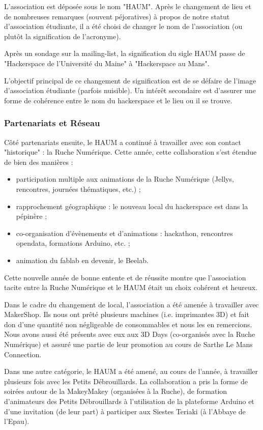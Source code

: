\documentclass[a4paper, 11pt]{article}
\begin{document}
L'association est déposée sous le nom "HAUM". Après le changement de lieu et de nombreuses remarques (souvent péjoratives) à propos de notre statut d'association étudiante, il a été choisi de changer le nom de l'association (ou plutôt la signification de l'acronyme).

Après un sondage sur la mailing-list, la signification du sigle HAUM passe de "Hackerspace de l'Université du Maine" à "Hackerspace au Mans".

L'objectif principal de ce changement de signification est de se défaire de l'image d'association étudiante (parfois nuisible). Un intérêt secondaire est d'assurer une forme de cohérence entre le nom du hackerspace et le lieu ou il se trouve.

\subsubsection{Partenariats et Réseau}


Côté partenariats ensuite, le HAUM a continué à travailler avec son contact "historique" : la Ruche Numérique. Cette année, cette collaboration s'est étendue de bien des manières :

\begin{itemize}
    \item participation multiple aux animations de la Ruche Numérique (Jellys, rencontres, journées thématiques, etc.) ;
    \item rapprochement géographique : le nouveau local du hackerspace est dans la pépinère ;
    \item co-organisation d'évènements et d'animations : hackathon, rencontres opendata, formations Arduino, etc. ;
    \item animation du fablab en devenir, le Beelab.
\end{itemize}

Cette nouvelle année de bonne entente et de réussite montre que l'association tacite entre la Ruche Numérique et le HAUM était un choix cohérent et heureux.

Dans le cadre du changement de local, l'association a été amenée à travailler avec MakerShop. Ils nous ont prêté plusieurs machines (i.e. imprimantes 3D) et fait don d'une quantité non négligeable de consommables et nous les en remercions. Nous avons aussi été présents avec eux aux 3D Days (co-organisés avec la Ruche Numérique) et assuré une partie de leur promotion au cours de Sarthe Le Mans Connection.

Dans une autre catégorie, le HAUM a été amené, au cours de l'année, à travailler plusieurs fois avec les Petits Débrouillards. La collaboration a pris la forme de soirées autour de la MakeyMakey (organisées à la Ruche), de formation d'animateurs des Petits Débrouillards à l'utilisation de la plateforme Arduino et d'une invitation (de leur part) à participer aux Siestes Teriaki (à l'Abbaye de l'Epau).
\end{document}
